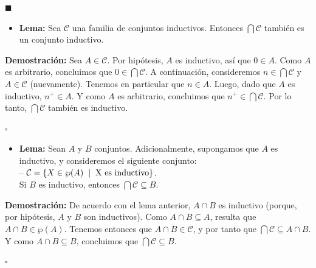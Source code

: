 \documentclass[10 pt]{article}
\begin{document}
{\begin{flushright}
    $\blacksquare$
\end{flushright}

\begin{itemize}
    \item \Large{\textbf{Lema:} Sea $\mathcal{C}$ una familia de conjuntos inductivos. Entonces $\bigcap \mathcal{C}$ también es un conjunto inductivo.} \\
\end{itemize}

\Large{\textbf{Demostración:} Sea $A \in \mathcal{C}$. Por hipótesis, $A$ es inductivo, así que $0 \in A$. Como $A$ es arbitrario, concluimos que $0 \in \bigcap \mathcal C$. A continuación, consideremos $n \in \bigcap \mathcal C$ y $A \in \mathcal C$ (nuevamente). Tenemos en particular que $n \in A$. Luego, dado que $A$ es inductivo, $n^+ \in A$. Y como $A$ es arbitrario, concluimos que $n^+ \in \bigcap \mathcal C$. Por lo tanto, $\bigcap \mathcal C$ también es inductivo.} \\

\begin{flushright}
    $\square$
\end{flushright}

\begin{itemize}
    \item \Large{\textbf{Lema:} Sean $A$ y $B$ conjuntos. Adicionalmente, supongamos que $A$ es inductivo, y consideremos el siguiente conjunto: \\

    -- $\mathcal C=\{X \in \wp(A) \hspace{0.2 cm}|\hspace{0.2 cm}\text{X es inductivo}\}$. \\

    Si $B$ es inductivo, entonces $\bigcap \mathcal C \subseteq B$.} \\
\end{itemize}

\Large{\textbf{Demostración:} De acuerdo con el lema anterior, $A \cap B$ es inductivo (porque, por hipótesis, $A$ y $B$ son inductivos). Como $A \cap B \subseteq A$, resulta que $A \cap B \in \wp(A)$. Tenemos entonces que $A \cap B \in \mathcal C$, y por tanto que $\bigcap \mathcal C \subseteq A \cap B$. Y como $A \cap B \subseteq B$, concluimos que $\bigcap \mathcal C \subseteq B$.} \\

\begin{flushright}
    $\square$
\end{flushright}

}
\end{document}
